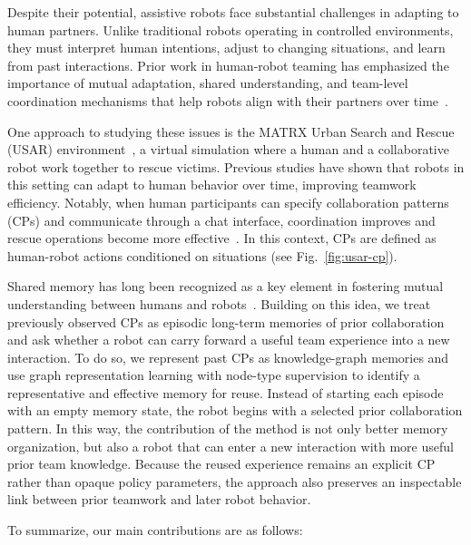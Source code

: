 \documentclass[letterpaper, 10 pt, conference]{ieeeconf}  %
\begin{document}
Despite their potential, assistive robots face substantial challenges in adapting to
human partners. Unlike traditional robots operating in controlled environments, they
must interpret human intentions, adjust to changing situations, and learn from past
interactions. Prior work in human-robot teaming has emphasized the importance of mutual
adaptation, shared understanding, and team-level coordination mechanisms that help
robots align with their partners over
time~\cite{Nikolaidis,ChaconQuesada2024SharedMentalModels,Haripriyan2024TeamDynamics}.

One approach to studying these issues is the MATRX Urban Search and Rescue (USAR)
environment~\cite{matrx_2023,vanZoelen2021}, a virtual simulation where a human and a
collaborative robot work together to rescue victims. Previous studies have shown that
robots in this setting can adapt to human behavior over time, improving teamwork
efficiency. Notably, when human participants can specify collaboration patterns (CPs)
and communicate through a chat interface, coordination improves and rescue operations
become more effective~\cite{10.1145/3434074.3446354,vanZoelen2021,vanZoelen2022}. In
this context, CPs are defined as human-robot actions conditioned on situations (see
Fig.~\ref{fig:usar-cp}).

Shared memory has long been recognized as a key element in fostering mutual
understanding between humans and robots~\cite{Miraglia2024Shared}. Building on this
idea, we treat previously observed CPs as episodic long-term memories of prior
collaboration and ask whether a robot can carry forward a useful team experience into a
new interaction. To do so, we represent past CPs as knowledge-graph memories and use
graph representation learning with node-type supervision to identify a representative
and effective memory for reuse. Instead of starting each episode with an empty memory
state, the robot begins with a selected prior collaboration pattern. In this way, the
contribution of the method is not only better memory organization, but also a robot that
can enter a new interaction with more useful prior team knowledge. Because the reused
experience remains an explicit CP rather than opaque policy parameters, the approach
also preserves an inspectable link between prior teamwork and later robot behavior.

To summarize, our main contributions are as follows:
\end{document}
